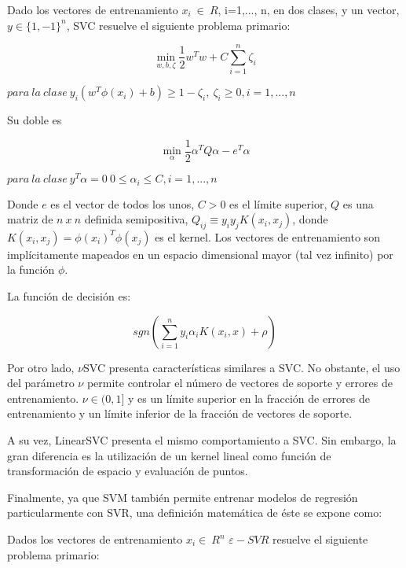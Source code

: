 Dado los vectores de entrenamiento $x_{i}\ \in\ R$,
i=1,..., n, en dos clases, y un vector, $y \in \{1, -1\}^n$, SVC resuelve el siguiente problema primario:

\begin{equation}
	\min_ {w, b, \zeta} \frac{1}{2} w^T w + C \sum_{i=1}^{n} \zeta_i
\end{equation}
\begin{center}	
	$para\ la\ clase\ y_i (w^T \phi (x_i) + b) \geq 1 - \zeta_i,\ \zeta_i \geq 0, i=1, ..., n$	
\end{center}

Su doble es

\begin{equation}
	\min_{\alpha} \frac{1}{2} \alpha^T Q \alpha - e^T \alpha
\end{equation}
\begin{center}
	$para\ la\ clase\ y^T \alpha = 0\ 0 \leq \alpha_i \leq C, i=1, ..., n$
\end{center}

Donde $e$ es el vector de todos los unos, $C > 0$ es el límite superior, $Q$ es una matriz de $n\ x\ n$ definida semipositiva, $Q_{ij} \equiv y_i y_j K(x_i, x_j)$, donde $K(x_i, x_j) = \phi (x_i)^T \phi (x_j)$ es el kernel. Los vectores de entrenamiento son implícitamente mapeados en un espacio dimensional mayor (tal vez infinito) por la función $\phi$.

La función de decisión es:

\begin{equation}
	sgn(\sum_{i=1}^n y_i \alpha_i K(x_i, x) + \rho)
\end{equation}

Por otro lado, $\nu$SVC presenta características similares a SVC. No obstante, el uso del parámetro $\nu$ permite controlar el número de vectores de soporte y errores de entrenamiento. $\nu \in (0, 1]$ y  es un límite superior en la fracción de errores de entrenamiento y un límite inferior de la fracción de vectores de soporte.

A su vez, LinearSVC presenta el mismo comportamiento a SVC. Sin embargo, la gran diferencia es la utilización de un kernel lineal como función de transformación de espacio y evaluación de puntos.

Finalmente, ya que SVM también permite entrenar modelos de regresión particularmente con SVR, una definición matemática de éste se expone como:

Dados los vectores de entrenamiento  $x_{i} \in\ R^n$  
$\varepsilon-SVR$ \cite{smola2004tutorial} resuelve el siguiente problema primario:


